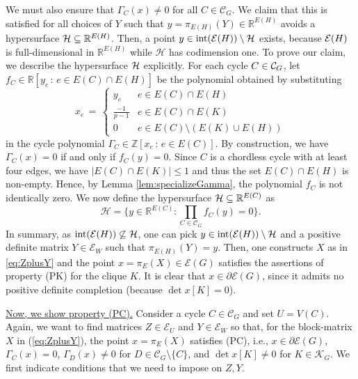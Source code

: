 \documentclass[a4paper, 11pt, twoside]{article}
\newcommand{\R}{\mathbb{R}}
\newcommand{\ME}{{\mathcal E}}
\newcommand{\MK}{{\mathcal K}}
\newcommand{\MC}{{\mathcal C}}
\newcommand{\MH}{{\mathcal H}}
\theoremstyle{plain}
\begin{document}
We must also ensure that $\Gamma_C(x)\ne 0$ for all $C\in\MC_{G}$. We claim that this is satisfied for all choices of $Y$ such that $y = \pi_{E(H)}(Y) \in \mathbb{R}^{E(H)}$ avoids a hypersurface ${\cal H} \subseteq \mathbb{R}^{E(H)}$. Then, a point $y \in {\rm int}({\cal E}(H)) \setminus {\cal H}$ exists, because ${\cal E}(H)$ is full-dimensional in $\mathbb{R}^{E(H)}$ while $\MH$ has codimension one.
To prove our claim, we describe the hypersurface ${\cal H}$ explicitly. For each cycle $C \in {\cal C}_G$, let $f_C \in \mathbb{R}[y_e \, : \, e \in E(C) \cap E(H)]$ be the polynomial obtained by substituting 
\[ x_e \, = \, \begin{cases} y_e & e \in E(C)\cap E(H) \\ 
\frac{-1}{p-1} & e \in E(C)\cap E(K) \\ 
0 & e \in E(C) \setminus (E(K) \cup E(H))
\end{cases}
\]
in the cycle polynomial $\Gamma_C \in \mathbb{Z}[x_e \, : \, e \in E(C)]$. 
By construction, we have $\Gamma_C(x) = 0$ if and only if $f_C(y) = 0$.
Since $C$ is a chordless cycle with at least four edges, we have $|E(C)\cap E(K)|\le 1$ and thus the set $E(C) \cap E(H)$ is non-empty. Hence, by Lemma \ref{lem:specializeGamma}, the polynomial $f_C$ is not identically zero.  We now define the hypersurface ${\cal H}\subseteq \R^{E(C)}$ as 
\[\MH=\Big\{y\in \R^{E(C)}: \prod_{C\in \MC_G} f_C(y)=0\Big\}.\]
In summary, as $\text{\rm int}(\ME(H))\not\subseteq \MH$, one can pick $y \in  {\rm int}({\cal E}(H)) \setminus {\cal H}$ and a positive definite matrix $Y\in\ME_W$ such that $\pi_{E(H)}(Y) = y$. Then, one constructs $X$ as in \eqref{eq:ZplusY} and  the point  $x = \pi_E(X) \in \ME(G)$ satisfies the assertions of property (PK) for the clique $K$. It is clear that $x \in \partial \ME(G)$, since it admits no positive definite completion (because $\det x[K]=0$).

\smallskip\noindent
\underline{Now, we show property (PC).} Consider a cycle $C\in \MC_{G}$ and set $U=V(C)$. Again, we want to  find matrices $Z\in \ME_U$ and $Y\in\ME_W$ so that, for  the block-matrix $X$ in (\ref{eq:ZplusY}),  
the point $x=\pi_E(X)$ satisfies (PC), i.e., $x\in\partial \ME(G)$, 
$\Gamma_C(x) = 0$, $\Gamma_{D}(x) \neq 0$ for  $D \in \MC_G \setminus \{C\}$, and $\det x[K] \neq 0$ for $K \in \MK_G$. We first indicate 
conditions that we need to impose on $Z,Y$.
\end{document}

